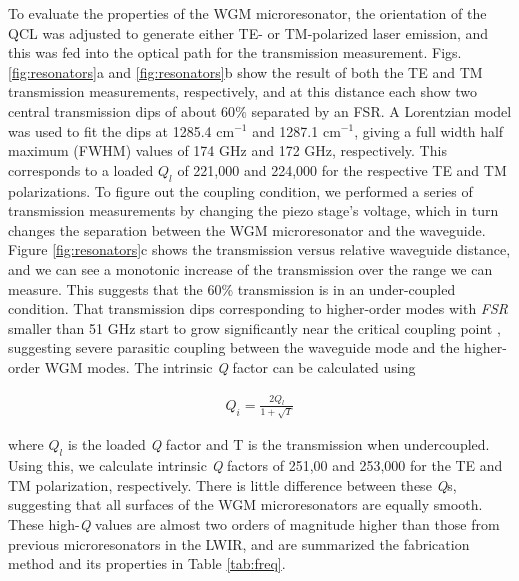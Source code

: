 \documentclass[fleqn,10pt,twocolumn]{wlscirep}
\begin{document}
To evaluate the properties of the WGM microresonator, the orientation of the QCL was adjusted to generate either TE- or TM-polarized laser emission, and this was fed into the optical path for the transmission measurement. Figs. \ref{fig:resonators}a and \ref{fig:resonators}b show the result of both the TE and TM transmission measurements, respectively, and at this distance each show two central transmission dips of about 60$\si{\%}$ separated by an FSR. A Lorentzian model was used to fit the dips at 1285.4 $\si{\cm^{-1}}$ and 1287.1 $\si{\cm^{-1}}$, giving a full width half maximum (FWHM) values of 174 GHz and 172 GHz, respectively. This corresponds to a loaded $Q_{l}$ of 221,000 and 224,000 for the respective TE and TM polarizations. To figure out the coupling condition, we performed a series of transmission measurements by changing the piezo stage's voltage, which in turn changes the separation between the WGM microresonator and the waveguide. Figure \ref{fig:resonators}c shows the transmission versus relative waveguide distance, and we can see a monotonic increase of the transmission over the range we can measure. This suggests that the 60\% transmission is in an under-coupled condition. That transmission dips corresponding to higher-order modes with \emph{FSR} smaller than 51 GHz start to grow significantly near the critical coupling point , suggesting severe parasitic coupling between the waveguide mode and the higher-order WGM modes. The intrinsic \emph{Q} factor can be calculated using\cite{millerLowlossSiliconPlatform2017}
\begin{ceqn}
\begin{align*}\label{eqn:intrinsicQ}
Q_{i} = \frac{2Q_{l}}{1+\sqrt{T}}\tag{1}
\end{align*}
\end{ceqn}
where $Q_{l}$ is the loaded \emph{Q} factor and T is the transmission when undercoupled. Using this, we calculate intrinsic \emph{Q} factors of 251,00 and 253,000 for the TE and TM polarization, respectively. There is little difference between these \emph{Q}s, suggesting that all surfaces of the WGM microresonators are equally smooth. These high-\emph{Q} values are almost two orders of magnitude higher than those from previous microresonators in the LWIR, and are summarized the fabrication method and its properties in Table \ref{tab:freq}. 
\end{document}
